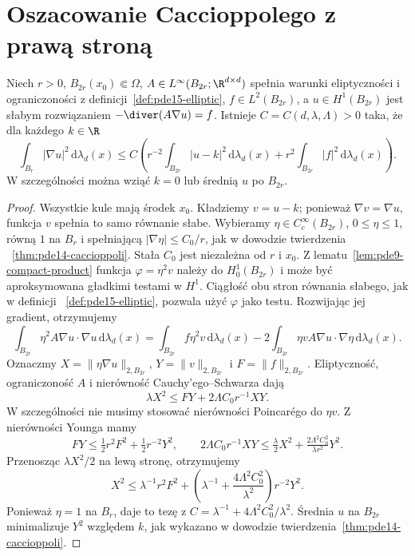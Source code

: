 \section{Oszacowanie Caccioppolego z prawą stroną}
\label{sec:pde15-caccioppoli}
\begin{stwierdzenie}
Niech $r>0$, $B_{2r}(x_0)\Subset\Omega$,
$A\in L^\infty(B_{2r};\R^{d\times d})$ spełnia warunki
eliptyczności i ograniczoności z definicji~\ref{def:pde15-elliptic},
$f\in L^2(B_{2r})$, a $u\in H^1(B_{2r})$ jest słabym
rozwiązaniem $-\diver(A\nabla u)=f$. Istnieje $C=C(d,\lambda,\Lambda)>0$
taka, że dla każdego $k\in\R$
\[
 \int_{B_r}|\nabla u|^2\,\mathrm d\lambda_d(x)
 \le C\left(r^{-2}\int_{B_{2r}}|u-k|^2\,\mathrm d\lambda_d(x)
 +r^2\int_{B_{2r}}|f|^2\,\mathrm d\lambda_d(x)\right).
\]
W szczególności można wziąć $k=0$ lub średnią $u$ po $B_{2r}$.
\end{stwierdzenie}
\begin{proof}
Wszystkie kule mają środek $x_0$. Kładziemy $v=u-k$;
ponieważ $\nabla v=\nabla u$, funkcja $v$ spełnia to samo
równanie słabe. Wybieramy $\eta\in C_c^\infty(B_{2r})$,
$0\le\eta\le1$, równą $1$ na $B_r$ i spełniającą
$|\nabla\eta|\le C_0/r$, jak w dowodzie twierdzenia
~\ref{thm:pde14-caccioppoli}. Stała $C_0$ jest niezależna
od $r$ i $x_0$. Z lematu~\ref{lem:pde9-compact-product}
funkcja $\varphi=\eta^2v$ należy do $H^1_0(B_{2r})$
i może być aproksymowana gładkimi testami w $H^1$.
Ciągłość obu stron równania słabego, jak w definicji
~\ref{def:pde15-elliptic}, pozwala użyć $\varphi$ jako testu.
Rozwijając jej gradient, otrzymujemy
\[
 \int_{B_{2r}}\eta^2 A\nabla u\cdot\nabla u\,\mathrm d\lambda_d(x)
 =\int_{B_{2r}}f\eta^2v\,\mathrm d\lambda_d(x)
 -2\int_{B_{2r}}\eta v A\nabla u\cdot\nabla\eta\,\mathrm d\lambda_d(x).
\]
Oznaczmy $X=\|\eta\nabla u\|_{2,B_{2r}}$,
$Y=\|v\|_{2,B_{2r}}$ i $F=\|f\|_{2,B_{2r}}$.
Eliptyczność, ograniczoność $A$ i nierówność
Cauchy'ego--Schwarza dają
\[
 \lambda X^2\le FY+2\Lambda C_0r^{-1}XY.
\]
W szczególności nie musimy stosować nierówności
Poincarégo do $\eta v$. Z nierówności Younga mamy
\[
 FY\le\tfrac12 r^2 F^2+\tfrac12 r^{-2}Y^2,\qquad
 2\Lambda C_0r^{-1}XY
 \le\tfrac{\lambda}{2}X^2+
       \tfrac{2\Lambda^2 C_0^2}{\lambda r^2}Y^2.
\]
Przenosząc $\lambda X^2/2$ na lewą stronę, otrzymujemy
\[
 X^2\le \lambda^{-1}r^2 F^2+
 \left(\lambda^{-1}+\frac{4\Lambda^2 C_0^2}{\lambda^2}\right)
 r^{-2}Y^2.
\]
Ponieważ $\eta=1$ na $B_r$, daje to tezę z
$C=\lambda^{-1}+4\Lambda^2C_0^2/\lambda^2$.
Średnia $u$ na $B_{2r}$ minimalizuje $Y^2$ względem $k$,
jak wykazano w dowodzie twierdzenia~\ref{thm:pde14-caccioppoli}.
\end{proof}

